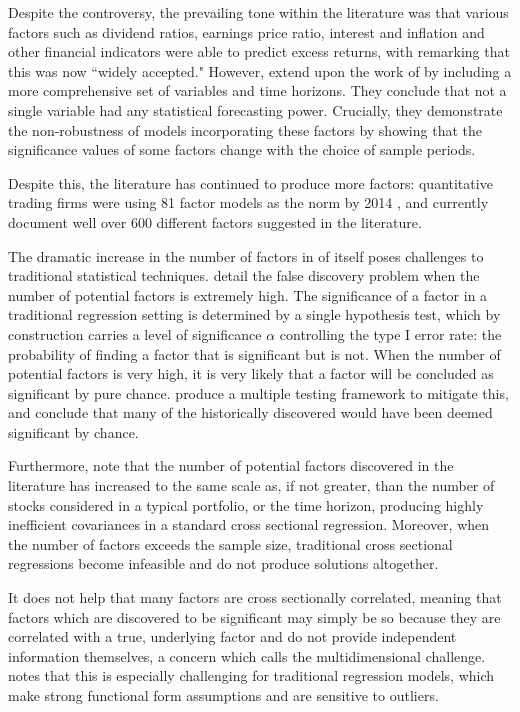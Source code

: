 \documentclass[a4paper, table]{article}
\begin{document}
Despite the controversy, the prevailing tone within the literature was that various factors such as dividend ratios, earnings price ratio, interest and inflation and other financial indicators were able to predict excess returns, with \cite{lettau_consumption_2001} remarking that this was now ``widely accepted." However, \cite{welch_comprehensive_2008} extend upon the work of \cite{goyal_predicting_2003} by including a more comprehensive set of variables and time horizons. They conclude that not a single variable had any statistical forecasting power. Crucially, they demonstrate the non-robustness of models incorporating these factors by showing that the significance values of some factors change with the choice of sample periods.

Despite this, the literature has continued to produce more factors: quantitative trading firms were using 81 factor models as the norm by 2014 \citep{hsu_finding_2014}, and \cite{harvey_census_2019} currently document well over 600 different factors suggested in the literature. 

The dramatic increase in the number of factors in of itself poses challenges to traditional statistical techniques. \cite{harvey__2016} detail the false discovery problem when the number of potential factors is extremely high. The significance of a factor in a traditional regression setting is determined by a single hypothesis test, which by construction carries a level of significance $\alpha$ controlling the type I error rate: the probability of finding a factor that is significant but is not. When the number of potential factors is very high, it is very likely that a factor will be concluded as significant by pure chance. \cite{harvey__2016} produce a multiple testing framework to mitigate this, and conclude that many of the historically discovered would have been deemed significant by chance.

Furthermore, \cite{feng_taming_2019} note that the number of potential factors discovered in the literature has increased to the same scale as, if not greater, than the number of stocks considered in a typical portfolio, or the time horizon, producing highly inefficient covariances in a standard cross sectional regression. Moreover, when the number of factors exceeds the sample size, traditional cross sectional regressions become infeasible and do not produce solutions altogether. 

It does not help that many factors are cross sectionally correlated, meaning that factors which are discovered to be significant may simply be so because they are correlated with a true, underlying factor and do not provide independent information themselves, a concern which \cite{cochrane_presidential_2011} calls the multidimensional challenge. \cite{freyberger_dissecting_2017} notes that this is especially challenging for traditional regression models, which make strong functional form assumptions and are sensitive to outliers. 
\end{document}
